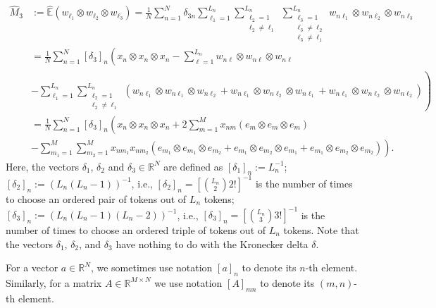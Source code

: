 \documentclass{article}
\newcommand{\sbra}[1]{\left[#1\right]}
\newcommand{\wh}[1]{\widehat{#1}}
\newcommand{\rr}[1]{\mathbb{R}^{#1}}
\newcommand{\tp}{\otimes}
\newcommand{\summ}{\sum_{m=1}^M}
\newcommand{\sumn}{\sum_{n=1}^N}
\newcommand{\gd}{\delta}
\newcommand{\ebb}{\mathbb{E}}
\begin{document}
\begin{align}
\nonumber
\wh{M}_3&:=\wh{\ebb}(w_{\ell_1}\tp w_{\ell_2}\tp w_{\ell_3}) = \frac{1}{N} \sumn \delta_{3n} \sum_{\ell_1=1}^{L_n} \sum_{\substack{\ell_2=1\\\ell_2\ne \ell_1}}^{L_n}\sum_{\substack{\ell_3=1\\\ell_3\ne\ell_2\\ \ell_3\ne\ell_1}}^{L_n} w_{n\ell_1}\tp w_{n\ell_2}\tp w_{n\ell_3} \\
\nonumber
&= \frac{1}{N}\sumn [\delta_3]_n \left( x_n \tp x_n\tp x_n -\sum_{\ell=1}^{L_n} w_{n\ell}\tp w_{n\ell} \tp w_{n\ell} \right. \\
\nonumber
& \left. - \sum_{\ell_1=1}^{L_n}\sum_{\substack{\ell_2=1\\ \ell_2\ne\ell_1}}^{L_n}(w_{n\ell_1}\tp w_{n\ell_1}\tp w_{n\ell_2} + w_{n\ell_1}\tp w_{n\ell_2}\tp w_{n\ell_1} + w_{n\ell_1}\tp w_{n\ell_2}\tp w_{n\ell_2}) \right) \\
\nonumber
&= \frac{1}{N}\sumn [\delta_3]_n \left( x_n\tp x_n \tp x_n + 2\summ x_{nm} (e_m\tp e_m\tp e_m) \right. \\
\label{m3final}
& \left. - \sum_{m_1=1}^M\sum_{m_2=1}^M x_{nm_1} x_{nm_2} (e_{m_1}\tp e_{m_1} \tp e_{m_2} + e_{m_1}\tp e_{m_2}\tp e_{m_1} + e_{m_1}\tp e_{m_2} \tp e_{m_2}) \right).
\end{align}
Here, the vectors $\gd_1$, $\gd_2$ and $\gd_3 \in\rr{N}$ are defined as $\sbra{\delta_1}_n := L_n^{-1}$; $\sbra{\delta_2}_n := (L_n(L_n-1))^{-1}$, i.e., $\sbra{\delta_2}_n = \sbra{{L_n \choose 2} 2!}^{-1}$ is the number of times to choose an ordered pair of tokens out of $L_n$ 
tokens;  $[\delta_3]_n := (L_n(L_n-1)(L_n-2))^{-1}$, i.e., $[\delta_3]_n = \sbra{{L_n \choose 3} 3!}^{-1}$ is the number of times to choose an ordered triple of tokens out of $L_n$ tokens. Note that the vectors $\gd_1$, $\gd_2$, and $\gd_3$ have nothing to do with the Kronecker delta $\gd$.

For a vector $a\in\rr{N}$, we sometimes use notation $\sbra{a}_n$ to denote its $n$-th element. Similarly, for a matrix $A\in\rr{M\times N}$ we use notation $\sbra{A}_{mn}$ to denote its $(m,n)$-th element.
\end{document}
